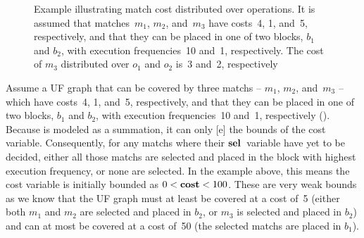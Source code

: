 \begin{figure}
  \caption[Example illustrating match cost distributed over operations]%
          {%
            Example illustrating match cost distributed over operations.
            It is assumed that matches~$m_1$, $m_2$, and~$m_3$ have
            costs~\num{4}, \num{1}, and~\num{5}, respectively, and that they can
            be placed in one of two blocks, $b_1$ and $b_2$, with execution
            frequencies~\num{10} and~\num{1}, respectively.
            The cost of $m_3$ distributed over $o_1$ and $o_2$ is~\num{3}
            and~\num{2}, respectively%
          }
\end{figure}
%
Assume a \gls{UF graph} that can be covered by three \glspl{match} -- $m_1$,
$m_2$, and~$m_3$ -- which have costs~\num{4}, \num{1}, and~\num{5},
respectively, and that they can be placed in one of two blocks, $b_1$ and $b_2$,
with execution frequencies~\num{10} and~\num{1}, respectively
().
%
Because  is modeled as a summation, it can
only [e] the bounds of the \gls{cost variable}.
%
Consequently, for any \glspl{match} where their $\mVar{sel}$~\gls{variable} have
yet to be decided, either all those \glspl{match} are selected and placed in the
\gls{block} with highest execution frequency, or none are selected.
%
In the example above, this means the \gls{cost variable} is initially bounded as
\mbox{$0 < \mVar{cost} < 100$}.
%
These are very weak bounds as we know that the \gls{UF graph} must at least be
covered at a cost of~\num{5} (either both $m_1$ and $m_2$ are selected and
placed in $b_2$, or $m_3$ is selected and placed in $b_2$) and can at most be
covered at a cost of~\num{50} (the selected \glspl{match} are placed in $b_1$).

